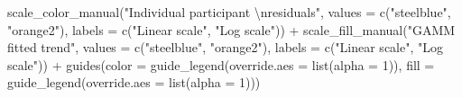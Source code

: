 \documentclass[print]{nuthesis}
\newenvironment{Shaded}{\begin{snugshade}}{\end{snugshade}}
\newcommand{\AttributeTok}[1]{\textcolor[rgb]{0.77,0.63,0.00}{#1}}
\newcommand{\DecValTok}[1]{\textcolor[rgb]{0.00,0.00,0.81}{#1}}
\newcommand{\FunctionTok}[1]{\textcolor[rgb]{0.00,0.00,0.00}{#1}}
\newcommand{\NormalTok}[1]{#1}
\newcommand{\SpecialCharTok}[1]{\textcolor[rgb]{0.00,0.00,0.00}{#1}}
\newcommand{\StringTok}[1]{\textcolor[rgb]{0.31,0.60,0.02}{#1}}
\begin{document}
\begin{Shaded}
\begin{Highlighting}[]
  \FunctionTok{scale\_color\_manual}\NormalTok{(}\StringTok{"Individual participant }\SpecialCharTok{\textbackslash{}n}\StringTok{residuals"}\NormalTok{, }\AttributeTok{values =} \FunctionTok{c}\NormalTok{(}\StringTok{"steelblue"}\NormalTok{, }\StringTok{"orange2"}\NormalTok{), }\AttributeTok{labels =} \FunctionTok{c}\NormalTok{(}\StringTok{"Linear scale"}\NormalTok{, }\StringTok{"Log scale"}\NormalTok{)) }\SpecialCharTok{+}
  \FunctionTok{scale\_fill\_manual}\NormalTok{(}\StringTok{"GAMM fitted trend"}\NormalTok{, }\AttributeTok{values =} \FunctionTok{c}\NormalTok{(}\StringTok{"steelblue"}\NormalTok{, }\StringTok{"orange2"}\NormalTok{), }\AttributeTok{labels =} \FunctionTok{c}\NormalTok{(}\StringTok{"Linear scale"}\NormalTok{, }\StringTok{"Log scale"}\NormalTok{)) }\SpecialCharTok{+}
  \FunctionTok{guides}\NormalTok{(}\AttributeTok{color =} \FunctionTok{guide\_legend}\NormalTok{(}\AttributeTok{override.aes =} \FunctionTok{list}\NormalTok{(}\AttributeTok{alpha =} \DecValTok{1}\NormalTok{)),}
         \AttributeTok{fill =} \FunctionTok{guide\_legend}\NormalTok{(}\AttributeTok{override.aes =} \FunctionTok{list}\NormalTok{(}\AttributeTok{alpha =} \DecValTok{1}\NormalTok{)))}


\end{Highlighting}
\end{Shaded}
\end{document}

